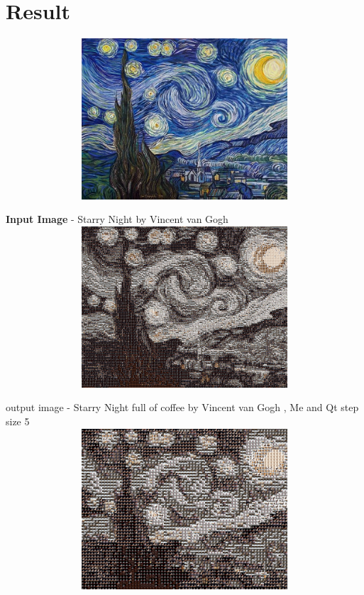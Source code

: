 \documentclass[a4paper,12pt]{report}
\begin{document}
 
 
	\chapter{Result }
	
	
	
	\begin{center}
	\includegraphics[width=14cm, height=6cm, 
		keepaspectratio]{GN} 
		
		{\textbf{Input Image} - Starry Night by Vincent van Gogh}\\
		
		
	
		\includegraphics[width=14cm, height=6cm, 
		keepaspectratio]{output-5} 
		
		{output image - Starry Night full of coffee by Vincent van Gogh , Me and Qt step size 5 }\\
		

	\includegraphics[width=14cm, height=6cm, 
		keepaspectratio]{output-10} 
		

\end{center}
\end{document}
